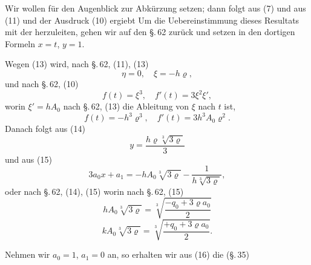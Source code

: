 
Wir wollen für den Augenblick zur Abkürzung
setzen; dann folgt aus (7)
und aus (11)
und der Ausdruck (10) ergiebt
Um die Uebereinstimmung dieses Resultats mit der  herzuleiten, gehen wir auf den \S.\,62 zurück und setzen in den dortigen Formeln $x = t$, $y = 1$.

Wegen (13) wird, nach \S.\,62, (11), (13)
\[
\eta = 0, \quad \xi = -h \varrho,
\]
und nach \S.\,62, (10)
\[
f(t) = \xi^3, \quad f'(t) = 3 \xi^2 \xi',
\]
worin $\xi' = h A_0$ nach \S.\,62, (13) die Ableitung von $\xi$ nach $t$ ist,
\[
f(t) = -h^3 \varrho^3, \quad f'(t) = 3 h^3 A_0 \varrho^2.
\]
Danach folgt aus (14)
\[
y = \frac{h \varrho \sqrt[3]{3 \varrho}}{3}
\]
und aus (15)
\[
3 a_0 x + a_1 = -h A_0 \sqrt[3]{3 \varrho} - \frac{1}{h \sqrt[3]{3 \varrho}},
\]
oder nach \S.\,62, (14), (15)
worin nach \S.\,62, (15)
\[
h A_0 \sqrt[3]{3 \varrho} = \sqrt[3]{\frac{-q_0 + 3 \varrho a_0}{2}}
\]
\[
k A_0 \sqrt[3]{3 \varrho} = \sqrt[3]{\frac{+q_0 + 3 \varrho a_0}{2}}.
\]

Nehmen wir $a_0 = 1$, $a_1 = 0$ an, so erhalten wir aus (16) die  (\S.\,35)

